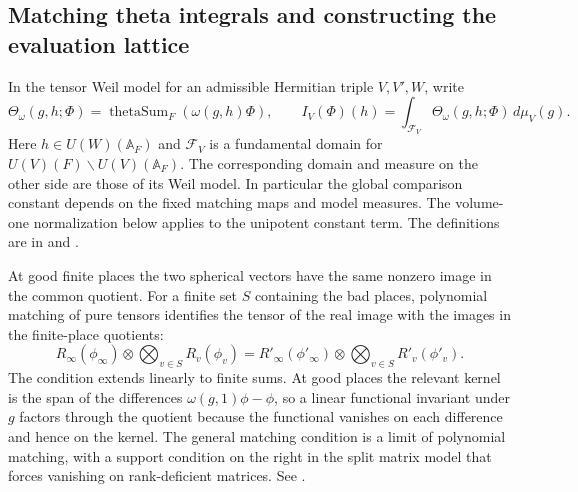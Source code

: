 \subsection{Matching theta integrals and constructing the evaluation lattice}

In the tensor Weil model for an admissible Hermitian triple \(V,V',W\), write
\[
 \Theta_\omega(g,h;\Phi)=\operatorname{thetaSum}_F(\omega(g,h)\Phi),
 \qquad I_V(\Phi)(h)=
 \int_{\mathcal F_V}\Theta_\omega(g,h;\Phi)\,d\mu_V(g).
\]
Here \(h\in U(W)(\mathbb A_F)\) and \(\mathcal F_V\) is a fundamental domain for \(U(V)(F)\backslash U(V)(\mathbb A_F)\). The corresponding domain and measure on the other side are those of its Weil model. In particular the global comparison constant depends on the fixed matching maps and model measures. The volume-one normalization below applies to the unipotent constant term. The definitions are in  and .

At good finite places the two spherical vectors have the same nonzero image in the common quotient. For a finite set \(S\) containing the bad places, polynomial matching of pure tensors identifies the tensor of the real image with the images in the finite-place quotients:
\[
 R_\infty(\phi_\infty)\otimes\bigotimes_{v\in S}R_v(\phi_v)
 =
 R'_\infty(\phi'_\infty)\otimes\bigotimes_{v\in S}R'_v(\phi'_v).
\]
The condition extends linearly to finite sums. At good places the relevant kernel is the span of the differences \(\omega(g,1)\phi-\phi\), so a linear functional invariant under \(g\) factors through the quotient because the functional vanishes on each difference and hence on the kernel. The general matching condition is a limit of polynomial matching, with a support condition on the right in the split matrix model that forces vanishing on rank-deficient matrices. See .

